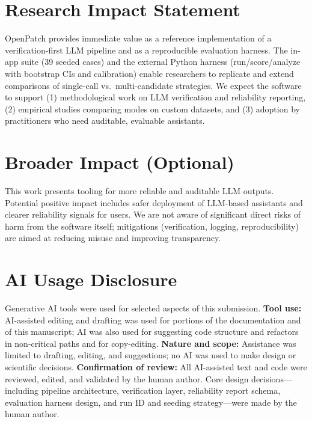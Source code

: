 \documentclass[10pt]{article}
\begin{document}
\section{Research Impact Statement}
OpenPatch provides immediate value as a reference implementation of a verification-first LLM pipeline and as a reproducible evaluation harness. The in-app suite (39 seeded cases) and the external Python harness (run/score/analyze with bootstrap CIs and calibration) enable researchers to replicate and extend comparisons of single-call vs.\ multi-candidate strategies. We expect the software to support (1) methodological work on LLM verification and reliability reporting, (2) empirical studies comparing modes on custom datasets, and (3) adoption by practitioners who need auditable, evaluable assistants.

\section*{Broader Impact (Optional)}
This work presents tooling for more reliable and auditable LLM outputs. Potential positive impact includes safer deployment of LLM-based assistants and clearer reliability signals for users. We are not aware of significant direct risks of harm from the software itself; mitigations (verification, logging, reproducibility) are aimed at reducing misuse and improving transparency.

\section*{AI Usage Disclosure}
Generative AI tools were used for selected aspects of this submission. \textbf{Tool use:} AI-assisted editing and drafting was used for portions of the documentation and of this manuscript; AI was also used for suggesting code structure and refactors in non-critical paths and for copy-editing. \textbf{Nature and scope:} Assistance was limited to drafting, editing, and suggestions; no AI was used to make design or scientific decisions. \textbf{Confirmation of review:} All AI-assisted text and code were reviewed, edited, and validated by the human author. Core design decisions---including pipeline architecture, verification layer, reliability report schema, evaluation harness design, and run ID and seeding strategy---were made by the human author.
\end{document}

